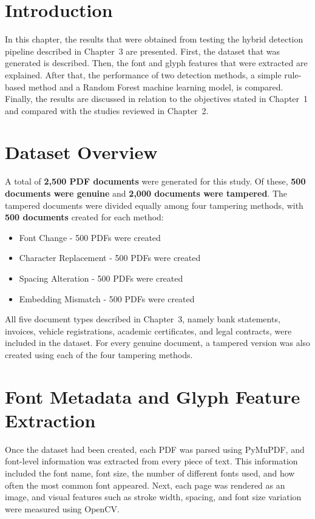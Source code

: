 \section{Introduction}

In this chapter, the results that were obtained from testing the hybrid detection pipeline described in Chapter~3 are presented. First, the dataset that was generated is described. Then, the font and glyph features that were extracted are explained. After that, the performance of two detection methods, a simple rule-based method and a Random Forest machine learning model, is compared. Finally, the results are discussed in relation to the objectives stated in Chapter~1 and compared with the studies reviewed in Chapter~2.

\section{Dataset Overview}

A total of \textbf{2,500 PDF documents} were generated for this study. Of these, \textbf{500 documents were genuine} and \textbf{2,000 documents were tampered}. The tampered documents were divided equally among four tampering methods, with \textbf{500 documents} created for each method:

\begin{itemize}
    \item Font Change - 500 PDFs were created
    \item Character Replacement - 500 PDFs were created
    \item Spacing Alteration - 500 PDFs were created
    \item Embedding Mismatch - 500 PDFs were created
\end{itemize}

\noindent All five document types described in Chapter~3, namely bank statements, invoices, vehicle registrations, academic certificates, and legal contracts, were included in the dataset. For every genuine document, a tampered version was also created using each of the four tampering methods.

\section{Font Metadata and Glyph Feature Extraction}

Once the dataset had been created, each PDF was parsed using PyMuPDF, and font-level information was extracted from every piece of text. This information included the font name, font size, the number of different fonts used, and how often the most common font appeared. Next, each page was rendered as an image, and visual features such as stroke width, spacing, and font size variation were measured using OpenCV.\\

